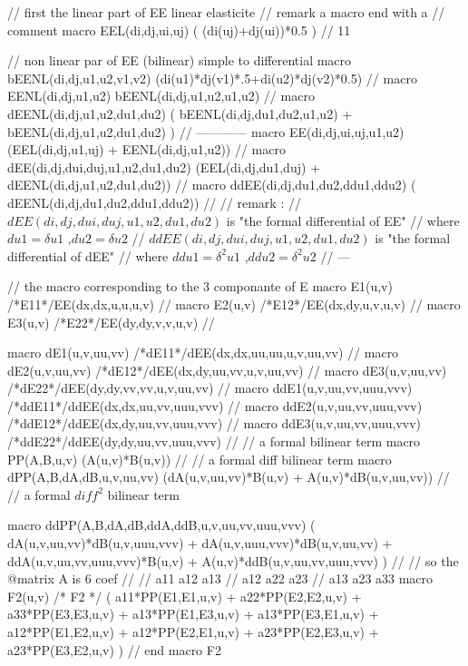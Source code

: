 \documentclass[twoside]{book}
\begin{document}
//  first the linear part of EE linear elasticite\hfilll
// remark a macro end with a // comment \hfilll
macro EEL(di,dj,ui,uj) ( (di(uj)+dj(ui))*0.5 )    // 11

// non linear par of EE (bilinear)  simple to differential \hfilll
macro bEENL(di,dj,u1,u2,v1,v2) (di(u1)*dj(v1)*.5+di(u2)*dj(v2)*0.5) 
// 
macro EENL(di,dj,u1,u2) bEENL(di,dj,u1,u2,u1,u2) // 
macro dEENL(di,dj,u1,u2,du1,du2) ( bEENL(di,dj,du1,du2,u1,u2) 
                                  + bEENL(di,dj,u1,u2,du1,du2) )   
//   ------------ \hfilll
macro EE(di,dj,ui,uj,u1,u2) (EEL(di,dj,u1,uj) + EENL(di,dj,u1,u2)) //
macro dEE(di,dj,dui,duj,u1,u2,du1,du2) (EEL(di,dj,du1,duj) 
                                         + dEENL(di,dj,u1,u2,du1,du2)) //
macro ddEE(di,dj,du1,du2,ddu1,ddu2) ( dEENL(di,dj,du1,du2,ddu1,ddu2)) 
//
// remark  : \hfilll
// $ dEE(di,dj,dui,duj,u1,u2,du1,du2)$  is "the formal differential of EE" \hfilll
// where $du1=\delta u1$ ,$du2=\delta u2$ \hfilll
// $ ddEE(di,dj,dui,duj,u1,u2,du1,du2)$  is "the formal differential of dEE" \hfilll
// where $ddu1=\delta^2 u1$ ,$ddu2=\delta^2 u2$ \hfilll
// --- \hfilll

//  the macro corresponding to the 3 componante of E \hfilll
macro E1(u,v)  /*E11*/EE(dx,dx,u,u,u,v)  //
macro E2(u,v)  /*E12*/EE(dx,dy,u,v,u,v)  //
macro E3(u,v)  /*E22*/EE(dy,dy,v,v,u,v)  //

macro dE1(u,v,uu,vv) /*dE11*/dEE(dx,dx,uu,uu,u,v,uu,vv) // 
macro dE2(u,v,uu,vv) /*dE12*/dEE(dx,dy,uu,vv,u,v,uu,vv) //
macro dE3(u,v,uu,vv) /*dE22*/dEE(dy,dy,vv,vv,u,v,uu,vv) //
macro ddE1(u,v,uu,vv,uuu,vvv) /*ddE11*/ddEE(dx,dx,uu,vv,uuu,vvv) //
macro ddE2(u,v,uu,vv,uuu,vvv) /*ddE12*/ddEE(dx,dy,uu,vv,uuu,vvv) //
macro ddE3(u,v,uu,vv,uuu,vvv) /*ddE22*/ddEE(dy,dy,uu,vv,uuu,vvv) 
//
//  a formal bilinear term \hfilll
macro PP(A,B,u,v) (A(u,v)*B(u,v)) 
// 
// a formal diff  bilinear term \hfilll
macro dPP(A,B,dA,dB,u,v,uu,vv) (dA(u,v,uu,vv)*B(u,v) + A(u,v)*dB(u,v,uu,vv)) 
//
// a formal $diff^2$ bilinear term \hfilll

macro ddPP(A,B,dA,dB,ddA,ddB,u,v,uu,vv,uuu,vvv) (
  dA(u,v,uu,vv)*dB(u,v,uuu,vvv) + dA(u,v,uuu,vvv)*dB(u,v,uu,vv) 
  +  ddA(u,v,uu,vv,uuu,vvv)*B(u,v) + A(u,v)*ddB(u,v,uu,vv,uuu,vvv) 
  ) //
// so the @matrix A is 6 coef \hfilll
//      
//     a11 a12 a13 \hfilll
//     a12 a22 a23 \hfilll
//     a13 a23 a33 \hfilll
macro F2(u,v)  /* F2 */  (
     a11*PP(E1,E1,u,v)
  +  a22*PP(E2,E2,u,v)
  +  a33*PP(E3,E3,u,v)
  +  a13*PP(E1,E3,u,v)
  +  a13*PP(E3,E1,u,v)
  +  a12*PP(E1,E2,u,v)
  +  a12*PP(E2,E1,u,v)
  +  a23*PP(E2,E3,u,v)
  +  a23*PP(E3,E2,u,v)
)  // end macro F2
\end{document}
